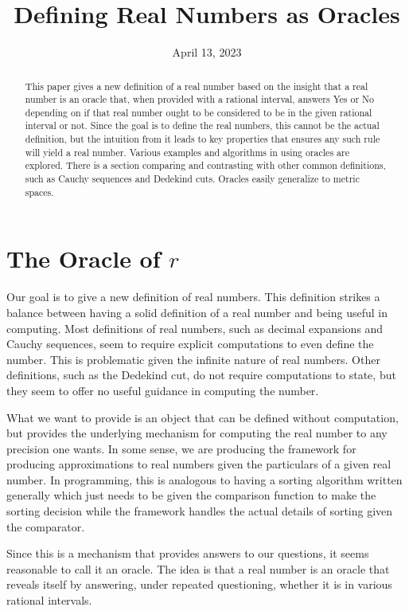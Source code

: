 \documentclass[12pt]{article}
\title{Defining Real Numbers as Oracles}
\date{April 13, 2023}
\begin{document}
\maketitle
\begin{abstract}
This paper gives a new definition of a real number based on the insight that a real number is an oracle that, when provided with a rational interval, answers Yes or No depending on if that real number ought to be considered to be in the given rational interval or not. Since the goal is to define the real numbers, this cannot be the actual definition, but the intuition from it leads to key properties that ensures any such rule will yield a real number. Various examples and algorithms in using oracles are explored. There is a section comparing and contrasting with  other common definitions, such as Cauchy sequences and Dedekind cuts. Oracles easily generalize to metric spaces. 
\end{abstract}

\tableofcontents

\section{The Oracle of $r$}\label{sec:ora}

Our goal is to give a new definition of real numbers. This definition strikes a balance between having a solid definition of a real number and being useful in computing. Most definitions of real numbers, such as decimal expansions and Cauchy sequences, seem to require explicit computations to even define the number. This is problematic given the infinite nature of real numbers. Other definitions, such as the Dedekind cut, do not require computations to state, but they seem to offer no useful guidance in computing the number. 

What we want to provide is an object that can be defined without computation, but provides the underlying mechanism for computing the real number to any precision one wants. In some sense, we are producing the framework for producing approximations to real numbers given the particulars of a given real number. In programming, this is analogous to having a sorting algorithm written generally which just needs to be given the comparison function to make the sorting decision while the framework handles the actual details of sorting given the comparator. 

Since this is a mechanism that provides answers to our questions, it seems reasonable to call it an oracle. The idea is that a real number is an oracle that reveals itself by answering, under repeated questioning, whether it is in various rational intervals. 
\end{document}
